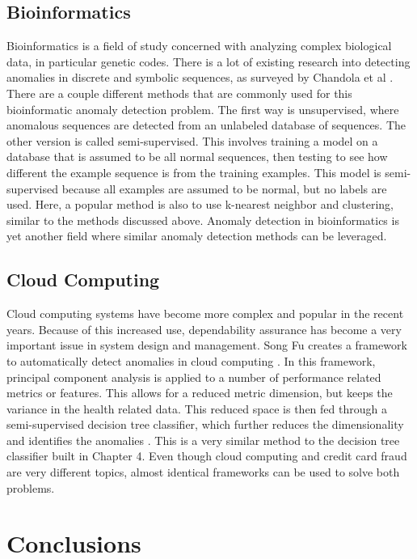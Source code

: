 \documentclass[midd]{thesis}
\begin{document}
\section{Bioinformatics}

Bioinformatics is a field of study concerned with analyzing complex biological data, in particular genetic codes. There is a lot of existing research into detecting anomalies in discrete and symbolic sequences, as surveyed by Chandola et al \cite{Chandola2012}. There are a couple different methods that are commonly used for this bioinformatic anomaly detection problem. The first way is unsupervised, where anomalous sequences are detected from an unlabeled database of sequences. The other version is called semi-supervised. This involves training a model on a database that is assumed to be all normal sequences, then testing to see how different the example sequence is from the training examples. This model is semi-supervised because all examples are assumed to be normal, but no labels are used. Here, a popular method is also to use k-nearest neighbor and clustering, similar to the methods discussed above. Anomaly detection in bioinformatics is yet another field where similar anomaly detection methods can be leveraged.


\section{Cloud Computing}

Cloud computing systems have become more complex and popular in the recent years. Because of this increased use, dependability assurance has become a very important issue in system design and management. Song Fu creates a framework to automatically detect anomalies in cloud computing  \cite{SongFu2011}. In this framework, principal component analysis is applied to a number of performance related metrics or features. This allows for a reduced metric dimension, but keeps the variance in the health related data. This reduced space is then fed through a semi-supervised decision tree classifier, which further reduces the dimensionality and identifies the anomalies \cite{SongFu2011}. This is a very similar method to the decision tree classifier built in Chapter 4. Even though cloud computing and credit card fraud are very different topics, almost identical frameworks can be used to solve both problems.


\pagebreak
\chapter{Conclusions}
\label{sec:conclusion}
\end{document}
